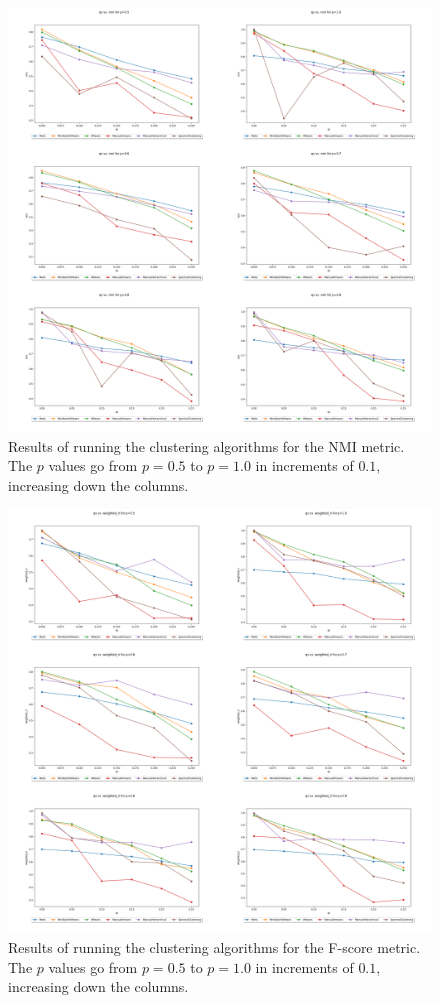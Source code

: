 \documentclass{article}
\begin{document}
\begin{figure}[H]
    \label{fig:results_nmi}
    \centering
    \includegraphics[width=1.15\textwidth]{results/results_nmi.png}
    \caption[Clustering NMI results]{Results of running the clustering algorithms for the NMI metric. The $p$ values go from $p=0.5$ to $p=1.0$ in increments of $0.1$, increasing down the columns.}
\end{figure}

\begin{figure}[H]
    \label{fig:results_weighted_ri}
    \centering
    \includegraphics[width=1.15\textwidth]{results/results_weighted_ri.png}
    \caption[Clustering weighted RI (F-score) results]{Results of running the clustering algorithms for the F-score metric. The $p$ values go from $p=0.5$ to $p=1.0$ in increments of $0.1$, increasing down the columns.}
\end{figure}
\end{document}
